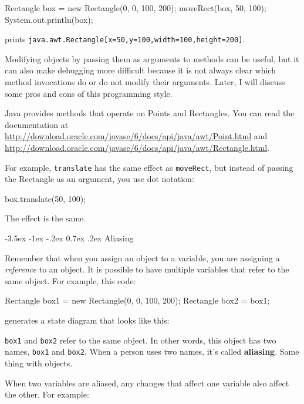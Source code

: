 \documentclass{book}
\makeatletter
\renewcommand{\section}{\@startsection 
    {section} {1} {0mm}%
    {-3.5ex \@plus -1ex \@minus -.2ex}%
    {0.7ex \@plus.2ex}%
    {\normalfont\Large\bfseries}}
\makeatother
\begin{document}
\begin{verbatimtab}
    Rectangle box = new Rectangle(0, 0, 100, 200);
    moveRect(box, 50, 100);
    System.out.println(box);
\end{verbatimtab}
%
prints {\tt java.awt.Rectangle[x=50,y=100,width=100,height=200]}.

Modifying objects by passing them as arguments to methods can be
useful, but it can also make debugging more difficult because it is
not always clear which method invocations do or do not modify their
arguments.  Later, I will discuss some pros and cons of this
programming style.

Java provides methods that operate on Points and Rectangles.  You can
read the documentation at
\url{http://download.oracle.com/javase/6/docs/api/java/awt/Point.html}
and
\url{http://download.oracle.com/javase/6/docs/api/java/awt/Rectangle.html}.

For example, {\tt translate} has the same effect as {\tt moveRect},
but instead of passing the Rectangle as an argument, you use dot
notation:

\begin{verbatimtab}
    box.translate(50, 100);
\end{verbatimtab}
%
The effect is the same.


\section{Aliasing}
\label{aliasing}

Remember that when you assign an object to a variable, you
are assigning a {\em reference} to an object.  It is possible to have
multiple variables that refer to the same object.  For example,
this code:

\begin{verbatimtab}
    Rectangle box1 = new Rectangle(0, 0, 100, 200);
    Rectangle box2 = box1;
\end{verbatimtab}
%
generates a state diagram that looks like this:




{\tt box1} and {\tt box2} refer to the same object.
In other words, this object has two names, {\tt box1} and {\tt box2}.
When a person uses two names, it's called {\bf aliasing}.  Same thing
with objects.

When two variables are aliased, any changes that affect one
variable also affect the other.  For example:
\end{document}
